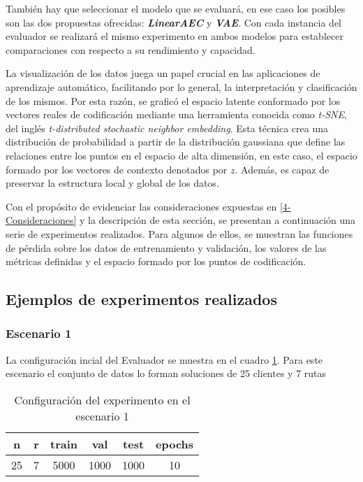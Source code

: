 También hay que seleccionar el modelo que se evaluará, en ese caso los posibles son las dos propuestas ofrecidas:  \textit{\textbf{LinearAEC}} y \textit{\textbf{VAE}}. Con cada instancia del evaluador se realizará el mismo experimento en ambos modelos para establecer comparaciones con respecto a su rendimiento y capacidad.

La visualización de los datos juega un papel crucial en las aplicaciones de aprendizaje automático, facilitando por lo general, la interpretación y clasificación de los mismos. Por esta razón, se graficó el espacio latente conformado por los vectores reales de codificación mediante una herramienta conocida como \textit{t-SNE}, del inglés \textit{t-distributed stochastic neighbor embedding}. Esta técnica crea una distribución de probabilidad a partir de la distribución gaussiana que define las relaciones entre los puntos en el espacio de alta dimensión, en este caso, el espacio formado por los vectores de contexto denotados por $z$. Además, es capaz de preservar la estructura local y global de los datos.

Con el propósito de evidenciar las consideraciones expuestas en \ref{4-Consideraciones} y la descripción de esta sección, se presentan a continuación una serie de experimentos realizados. Para algunos de ellos, se muestran las funciones de pérdida sobre los datos de entrenamiento y validación, los valores de las métricas definidas y el espacio formado por los puntos de codificación.

\subsection{Ejemplos de experimentos realizados}

\subsubsection{Escenario 1}

La configuración incial del Evaluador se muestra en el cuadro \ref{case1}. Para este escenario el conjunto de datos lo forman soluciones de 25 clientes y 7 rutas 

\begin{table}[h]
	\centering
	\caption{Configuración del experimento en el escenario 1}
	\begin{tabular}{|c|c|c|c|c|c|}
		\hline
		\textbf{n} & \textbf{r} & \textbf{train} & \textbf{val} & \textbf{test} & \textbf{epochs} \\
		\hline
		25 & 7 & 5000 & 1000 & 1000 & 10 \\
		\hline
	\end{tabular}
	\label{case1}
\end{table}

